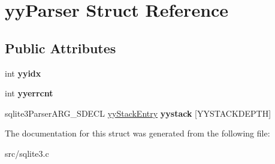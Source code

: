 \hypertarget{structyy_parser}{\section{yy\-Parser Struct Reference}
\label{structyy_parser}
}
\subsection*{Public Attributes}
\begin{DoxyCompactItemize}
\item 
\hypertarget{structyy_parser_a19abcf4780515fd2debd1ce7a2e29f95}{int {\bfseries yyidx}}\label{structyy_parser_a19abcf4780515fd2debd1ce7a2e29f95}

\item 
\hypertarget{structyy_parser_ac0350933aa515a3a756dfa742d04ee59}{int {\bfseries yyerrcnt}}\label{structyy_parser_ac0350933aa515a3a756dfa742d04ee59}

\item 
\hypertarget{structyy_parser_ae8bc1531d6ae56020a7ee33a40783672}{sqlite3\-Parser\-A\-R\-G\-\_\-\-S\-D\-E\-C\-L \hyperlink{structyy_stack_entry}{yy\-Stack\-Entry} {\bfseries yystack} \mbox{[}Y\-Y\-S\-T\-A\-C\-K\-D\-E\-P\-T\-H\mbox{]}}\label{structyy_parser_ae8bc1531d6ae56020a7ee33a40783672}

\end{DoxyCompactItemize}


The documentation for this struct was generated from the following file\-:\begin{DoxyCompactItemize}
\item 
src/sqlite3.\-c\end{DoxyCompactItemize}
